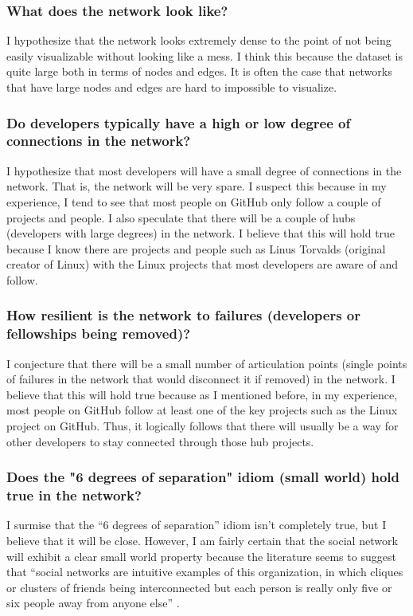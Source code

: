 \documentclass[9pt,twocolumn,twoside]{pnas-new}
\begin{document}
\subsubsection{What does the network look like?} I hypothesize that the network looks extremely dense to the point of not being easily visualizable without looking like a mess. I think this because the dataset is quite large both in terms of nodes and edges. It is often the case that networks that have large nodes and edges are hard to impossible to visualize.

\subsubsection{Do developers typically have a high or low degree of connections in the network?}

I hypothesize that most developers will have a small degree of connections in the network. That is, the network will be very spare. I suspect this because in my experience, I tend to see that most people on GitHub only follow a couple of projects and people. I also speculate that there will be a couple of hubs (developers with large degrees) in the network. I believe that this will hold true because I know there are projects and people such as Linus Torvalds (original creator of Linux) with the Linux projects that most developers are aware of and follow.

\subsubsection{How resilient is the network to failures (developers or fellowships being removed)?}

I conjecture that there will be a small number of articulation points (single points of failures in the network that would disconnect it if removed) in the network. I believe that this will hold true because as I mentioned before, in my experience, most people on GitHub follow at least one of the key projects such as the Linux project on GitHub. Thus, it logically follows that there will usually be a way for other developers to stay connected through those hub projects.

\subsubsection{Does the "6 degrees of separation" idiom (small world) hold true in the network?}

I surmise that the “6 degrees of separation” idiom isn't completely true, but I believe that it will be close. However, I am fairly certain that the social network will exhibit a clear small world property because the literature seems to suggest that “social networks are intuitive examples of this organization, in which cliques or clusters of friends being interconnected but each person is really only five or six people away from anyone else” \cite{PMC3604768}.
\end{document}
